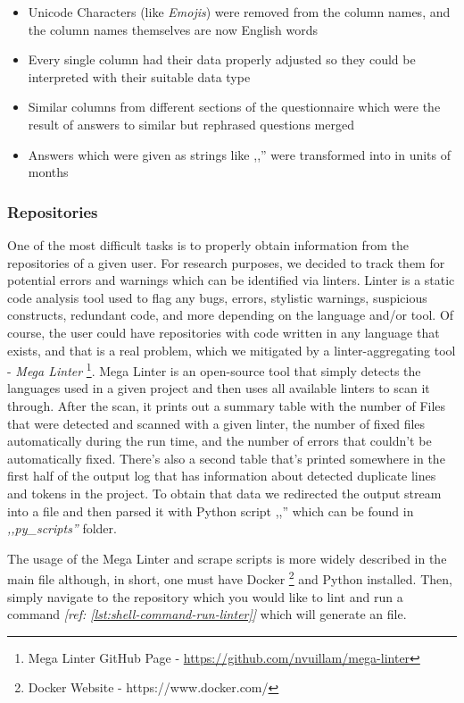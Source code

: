 \begin{itemize}
  \item Unicode Characters (like \emph{Emojis}) were removed from the column names, and the column names themselves are now English words
  \item Every single column had their data properly adjusted so they could be interpreted with their suitable data type
  \item Similar columns from different sections of the questionnaire which were the result of answers to similar but rephrased questions merged
  \item Answers which were given as strings like ,,'' were transformed into  in units of months
\end{itemize}

\subsubsection{Repositories}
\label{sec:data-prep-repositories}

One of the most difficult tasks is to properly obtain information from the repositories of a given user. For research purposes, we decided to track them for potential errors and warnings which can be identified via linters. Linter is a static code analysis tool used to flag any bugs, errors, stylistic warnings, suspicious constructs, redundant code, and more depending on the language and/or tool. Of course, the user could have repositories with code written in any language that exists, and that is a real problem, which we mitigated by a linter-aggregating tool - \emph{Mega Linter} \footnote{Mega Linter GitHub Page - \url{https://github.com/nvuillam/mega-linter}}. Mega Linter is an open-source tool that simply detects the languages used in a given project and then uses all available linters to scan it through. After the scan, it prints out a summary table with the number of Files that were detected and scanned with a given linter, the number of fixed files automatically during the run time, and the number of errors that couldn't be automatically fixed. There's also a second table that's printed somewhere in the first half of the output log that has information about detected duplicate lines and tokens in the project. To obtain that data we redirected the output stream into a file and then parsed it with Python script ,,'' which can be found in \emph{,,py\_scripts''} folder.

The usage of the Mega Linter and scrape scripts is more widely described in the main  file although, in short, one must have Docker \footnote{Docker Website - https://www.docker.com/} and Python installed. Then, simply navigate to the repository which you would like to lint and run a command \textit{[ref: \ref{lst:shell-command-run-linter}]} which will generate an  file.

